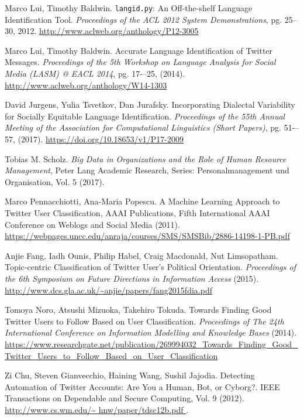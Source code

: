 \begin{thebibliography}{3}
 Marco Lui, Timothy Baldwin. {\tt langid.py}: An Off-the-shelf Language Identification Tool.
{\em Proceedings of the ACL 2012 System Demonstrations}, pg. 25--30, 2012.
\url{http://www.aclweb.org/anthology/P12-3005}

 Marco Lui, Timothy Baldwin. Accurate Language Identification of Twitter Messages. 
{\em Proceedings of the 5th Workshop on Language Analysis for Social Media (LASM) @ EACL 2014}, pg. 17-–25,
(2014). \url{http://www.aclweb.org/anthology/W14-1303}

 David Jurgens, Yulia Tsvetkov, Dan Jurafsky. Incorporating Dialectal Variability
for Socially Equitable Language Identification. 
{\em Proceedings of the 55th Annual Meeting of the Association for Computational Linguistics (Short Papers)}, 
pg. 51-–57, (2017). \url{https://doi.org/10.18653/v1/P17-2009}

 Tobias M. Scholz. {\em Big Data in Organizations and the Role of
Human Resource Management}, Peter Lang Academic Research, Series: Personalmanagement und
Organisation, Vol. 5 (2017).

Marco Pennacchiotti, Ana-Maria Popescu. A Machine Learning Approach to Twitter User 
Classification, AAAI Publications, Fifth International AAAI Conference on Weblogs and Social Media (2011).
\url{https://webpages.uncc.edu/anraja/courses/SMS/SMSBib/2886-14198-1-PB.pdf }

 Anjie Fang, Iadh Ounis, Philip Habel, Craig Macdonald, Nut Limsopatham.
Topic-centric Classification of Twitter User’s Political Orientation. {\em Proceedings of the 
6th Symposium on Future Directions in Information Access} (2015).
\url{http://www.dcs.gla.ac.uk/~anjie/papers/fang2015fdia.pdf }

 Tomoya Noro, Atsushi Mizuoka, Takehiro Tokuda. 
Towards Finding Good Twitter Users to Follow Based on User Classification.
{\em Proceedings of The 24th International Conference on Information Modelling and Knowledge 
Bases} (2014). \url{https://www.researchgate.net/publication/269994032_Towards_Finding_Good_Twitter_Users_to_Follow_Based_on_User_Classification }

 Zi Chu, Steven Gianvecchio, Haining Wang, Sushil Jajodia. 
Detecting Automation of Twitter Accounts: Are You a Human, Bot, or Cyborg?.
IEEE Transactions on Dependable and Secure Computing, Vol. 9 (2012).
\url{http://www.cs.wm.edu/\~ hnw/paper/tdsc12b.pdf }.


\end{thebibliography}

